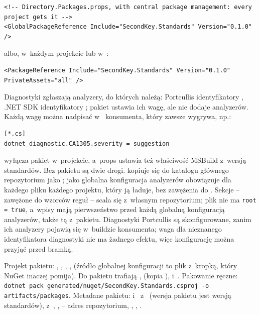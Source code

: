 \begin{lstlisting}
<!-- Directory.Packages.props, with central package management: every project gets it -->
<GlobalPackageReference Include="SecondKey.Standards" Version="0.1.0" />
\end{lstlisting}

albo, w~każdym projekcie lub w~:

\begin{lstlisting}
<PackageReference Include="SecondKey.Standards" Version="0.1.0" PrivateAssets="all" />
\end{lstlisting}

Diagnostyki zgłaszają analyzery, do których należą: Portcullis identyfikatory
, .NET SDK identyfikatory ; pakiet ustawia ich wagę, ale
nie dodaje analyzerów. Każdą wagę można nadpisać w~ konsumenta, który
zawsze wygrywa, np.:

\begin{lstlisting}
[*.cs]
dotnet_diagnostic.CA1305.severity = suggestion
\end{lstlisting}

 wyłącza pakiet
w~projekcie, a~props ustawia też właściwość MSBuild 
z~wersją standardów. Bez pakietu są dwie drogi. 
kopiuje się do katalogu głównego repozytorium jako ; jako globalna
konfiguracja analyzerów obowiązuje dla każdego pliku każdego projektu, który ją ładuje, bez
zawężenia do . Sekcje  -- zawężone
do wzorców  reguł -- scala się z~własnym 
repozytorium; plik nie ma \texttt{root = true}, a~wpisy  mają
pierwszeństwo przed każdą globalną konfiguracją analyzerów, także tą z~pakietu.
Diagnostyki Portcullis są skonfigurowane, zanim ich
analyzery pojawią się w~buildzie konsumenta; waga  dla nieznanego
identyfikatora diagnostyki nie ma żadnego efektu, więc konfigurację można przyjąć przed bramką.

Projekt pakietu: ,  ,
 , 
,   (źródło globalnej konfiguracji
to plik z~kropką, który NuGet inaczej pomija). Do pakietu trafiają
,  (kopia
),  i~. Pakowanie ręczne:
\texttt{dotnet pack generated/nuget/SecondKey.Standards.csproj -o artifacts/packages}.
Metadane pakietu:  i~ z~
(wersja pakietu jest wersją standardów), 
z~, 
,
 -- adres repozytorium, 
,  ,
 .

